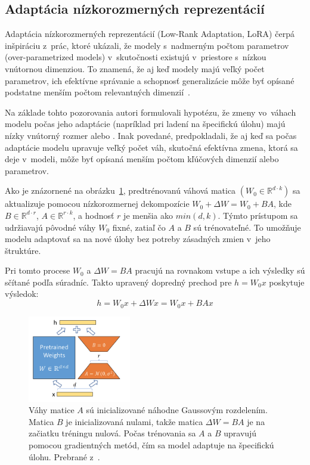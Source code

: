 \subsection{Adaptácia nízkorozmerných reprezentácií}

Adaptácia nízkorozmerných reprezentácií (Low-Rank Adaptation, LoRA) čerpá inšpiráciu z~prác, ktoré ukázali, že modely s~nadmerným počtom parametrov (over-parametrized models) v~skutočnosti existujú v~priestore s~nízkou vnútornou dimenziou. To znamená, že aj keď modely majú veľký počet parametrov, ich efektívne správanie a schopnosť generalizácie môže byť opísané podstatne menším počtom relevantných dimenzií~\cite{hu2021lora}.

Na základe tohto pozorovania autori formulovali hypotézu, že zmeny vo~váhach modelu počas jeho adaptácie (napríklad pri ladení na špecifickú úlohu) majú nízky vnútorný rozmer alebo . Inak povedané, predpokladali, že aj keď sa počas adaptácie modelu upravuje veľký počet váh, skutočná efektívna zmena, ktorá sa deje v~modeli, môže byť opísaná menším počtom kľúčových dimenzií alebo parametrov.

Ako je znázornené na obrázku~\ref{fig:lora}, predtrénovanú váhová matica $(W_0 \in \mathbb{R}^{d \cdot k})$ sa aktualizuje pomocou nízkorozmernej dekompozície $W_0 + \Delta W = W_0 + BA$, kde $B \in \mathbb{R}^{d \cdot r}$, $A \in \mathbb{R}^{r \cdot k}$, a hodnosť $r$ je menšia ako $min(d, k)$. Týmto prístupom sa udržiavajú pôvodné váhy $W_0$ fixné, zatiaľ čo $A$ a $B$ sú trénovateľné. To umožňuje modelu adaptovať sa na nové úlohy bez potreby zásadných zmien v~jeho štruktúre.

Pri tomto procese $W_0$ a $\Delta W = BA$ pracujú na rovnakom vstupe a ich výsledky sú sčítané podľa súradníc. Takto upravený dopredný prechod pre $h = W_0x$ poskytuje výsledok: $$h = W_0x + \Delta W x = W_0x + BAx$$ 

\begin{figure}
    \centering
    \includegraphics[width=0.4\textwidth]{obrazky/LoRA.png}
    \caption{Váhy matice $A$ sú inicializované náhodne Gaussovým rozdelením. Matica $B$ je inicializovaná nulami, takže matica $\Delta W = BA$ je na začiatku tréningu nulová. Počas trénovania sa $A$ a $B$ upravujú pomocou gradientných metód, čím sa model adaptuje na špecifickú úlohu. Prebrané z~\cite{hu2021lora}.}
    \label{fig:lora}
\end{figure}

